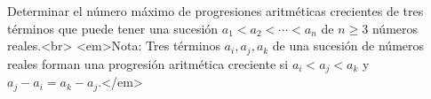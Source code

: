 Determinar el número máximo de progresiones aritméticas crecientes de tres términos que puede tener una sucesión $a_1 < a_2 < \cdots < a_n$ de $n \geq 3$ números reales.<br>
<em>Nota: Tres términos $a_i, a_j, a_k$ de una sucesión de números reales forman una progresión aritmética creciente si $a_i < a_j < a_k$ y $a_j - a_i = a_k - a_j$.</em>
